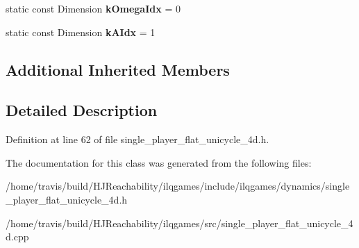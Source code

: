 \begin{DoxyCompactItemize}
\item 
static const Dimension {\bfseries k\+Omega\+Idx} = 0\hypertarget{classilqgames_1_1_single_player_flat_unicycle4_d_aeb2485251d0e23f2d09e34bc75bf19aa}{}\label{classilqgames_1_1_single_player_flat_unicycle4_d_aeb2485251d0e23f2d09e34bc75bf19aa}

\item 
static const Dimension {\bfseries k\+A\+Idx} = 1\hypertarget{classilqgames_1_1_single_player_flat_unicycle4_d_a23e2e7c24651bc528073b81d42ef6a6f}{}\label{classilqgames_1_1_single_player_flat_unicycle4_d_a23e2e7c24651bc528073b81d42ef6a6f}

\end{DoxyCompactItemize}
\subsection*{Additional Inherited Members}


\subsection{Detailed Description}


Definition at line 62 of file single\+\_\+player\+\_\+flat\+\_\+unicycle\+\_\+4d.\+h.



The documentation for this class was generated from the following files\+:\begin{DoxyCompactItemize}
\item 
/home/travis/build/\+H\+J\+Reachability/ilqgames/include/ilqgames/dynamics/single\+\_\+player\+\_\+flat\+\_\+unicycle\+\_\+4d.\+h\item 
/home/travis/build/\+H\+J\+Reachability/ilqgames/src/single\+\_\+player\+\_\+flat\+\_\+unicycle\+\_\+4d.\+cpp\end{DoxyCompactItemize}
